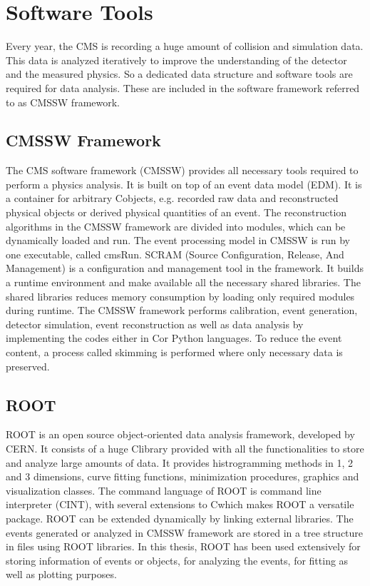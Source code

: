 \section{Software Tools}
Every year, the CMS is recording a huge amount of collision and simulation data. This data is analyzed iteratively to improve the understanding of the detector and the measured physics. So a dedicated data structure and software tools are required for data analysis. These are included in the software framework referred to as CMSSW framework.

\subsection{CMSSW Framework}
The CMS software framework (CMSSW) \cite{CMS:2005aa} provides all necessary tools required to perform a physics analysis. It is built on top of an event data model (EDM). It is a container for arbitrary C\plusn\plus objects, e.g. recorded raw data and reconstructed physical objects or derived physical quantities of an event. The reconstruction algorithms in the CMSSW framework are divided into modules, which can be dynamically loaded and run. The event processing model in CMSSW is run by one executable, called cmsRun. SCRAM (Source Configuration, Release, And Management) is a configuration and management tool in the framework. It builds a runtime environment and make available all the necessary shared libraries. The shared libraries reduces memory consumption by loading only required modules during runtime. The CMSSW framework performs calibration, event generation, detector simulation, event reconstruction as well as data analysis by implementing the codes either in C\plusn\plus or Python languages. To reduce the event content, a process called skimming is performed where only necessary data is preserved. 

\subsection{ROOT}
ROOT \cite{Brun:1997pa} is an open source object-oriented data analysis framework, developed by CERN. It consists of a huge C\plusn\plus library provided with all the functionalities to store and analyze large amounts of data. It provides histrogramming methods in 1, 2 and 3 dimensions, curve fitting functions, minimization procedures, graphics and visualization classes. The command language of ROOT is command line interpreter (CINT), with several extensions to C\plusn\plus which makes ROOT a versatile package. ROOT can be extended dynamically by linking external libraries. The events generated or analyzed in CMSSW framework are stored in a tree structure in files using ROOT libraries. In this thesis, ROOT has been used extensively for storing information of events or objects, for analyzing the events, for fitting as well as plotting purposes.

